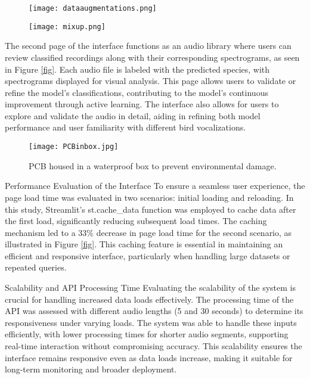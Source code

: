 \begin{figure}[h!]
    \centering
    \begin{minipage}{.5\textwidth}
        \centering
        \texttt{[image: dataaugmentations.png]}
        \label{fig:augmentation}
    \end{minipage}
    \begin{minipage}{.5\textwidth}
        \centering
        \texttt{[image: mixup.png]}
        \label{fig:augmentation}
    \end{minipage}
    \caption{}
    \label{fig:augmentation}
\end{figure}


The second page of the interface functions as an audio library where users can review classified recordings along with their corresponding spectrograms, as seen in Figure \ref{fig}. Each audio file is labeled with the predicted species, with spectrograms displayed for visual analysis. This page allows users to validate or refine the model’s classifications, contributing to the model’s continuous improvement through active learning. The interface also allows for users to explore and validate the audio in detail, aiding in refining both model performance and user familiarity with different bird vocalizations.

\begin{figure}[h]
    \centering
    \texttt{[image: PCBinbox.jpg]}
    \caption{PCB housed in a waterproof box to prevent environmental damage.}
    \vspace{0.1cm}
    \label{fig:pcb_box}
\end{figure}

Performance Evaluation of the Interface
To ensure a seamless user experience, the page load time was evaluated in two scenarios: initial loading and reloading. In this study, Streamlit’s st.cache_data function was employed to cache data after the first load, significantly reducing subsequent load times. The caching mechanism led to a 33\% decrease in page load time for the second scenario, as illustrated in Figure \ref{fig}. This caching feature is essential in maintaining an efficient and responsive interface, particularly when handling large datasets or repeated queries.

Scalability and API Processing Time
Evaluating the scalability of the system is crucial for handling increased data loads effectively. The processing time of the API was assessed with different audio lengths (5 and 30 seconds) to determine its responsiveness under varying loads. The system was able to handle these inputs efficiently, with lower processing times for shorter audio segments, supporting real-time interaction without compromising accuracy. This scalability ensures the interface remains responsive even as data loads increase, making it suitable for long-term monitoring and broader deployment.


